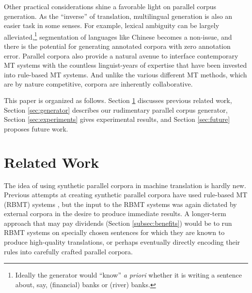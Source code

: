 Other practical considerations shine a favorable light on parallel corpus generation.
As the ``inverse'' of translation, multilingual generation is also an easier task in some senses.
For example, lexical ambiguity can be largely alleviated,\footnote{
    Ideally the generator would ``know'' {\em a priori} whether it is writing a sentence about, say, (financial) banks or (river) banks.
} segmentation of languages like Chinese  becomes a non-issue, and there is the potential for generating annotated corpora with zero annotation error.
Parallel corpora also provide a natural avenue to interface contemporary MT systems with the countless linguist-years of expertise that have been invested into rule-based MT systems. %
And unlike the various different MT methods, which are by nature competitive, corpora are inherently collaborative.

This paper is organized as follows.
Section \ref{sec:related} discusses previous related work,
Section \ref{sec:generator} describes our rudimentary parallel corpus generator,
Section \ref{sec:experiments} gives experimental results, 
and Section \ref{sec:future} proposes future work.



\section{Related Work}
\label{sec:related}

The idea of using synthetic parallel corpora in machine translation is hardly new.
Previous attempts at creating synthetic parallel corpora have used rule-based MT (RBMT) systems , but the input to the RBMT systems was again dictated by external corpora in the desire to produce immediate results.
A longer-term approach that may pay dividends (Section \ref{subsec:benefits}) would be to run RBMT systems on specially chosen sentences for which they are known to produce high-quality translations, or perhaps eventually directly encoding their rules into carefully crafted parallel corpora.

